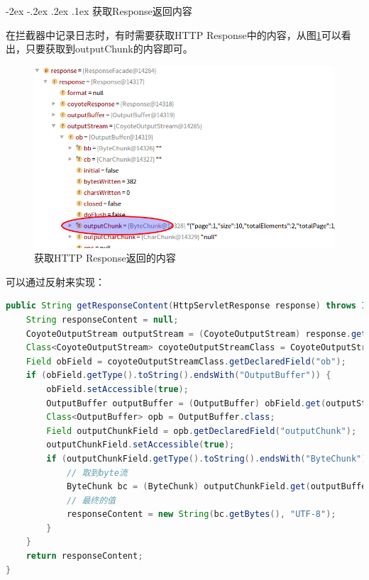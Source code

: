 \documentclass[12pt]{book}
\makeatletter
\numberwithin{dummy}{section}
\theoremstyle{ocrenumbox}
\theoremstyle{blacknumex}
\theoremstyle{blacknumbox}
\theoremstyle{ocrenum}
\renewcommand\paragraph{\@startsection{paragraph}{4}{\z@}
	{-2ex \@plus-.2ex \@minus .2ex}
	{.1ex}
	{\normalfont\small\sffamily\bfseries}}
\newlength\esp
\makeatother
\begin{document}
\paragraph{获取Response返回内容}

在拦截器中记录日志时，有时需要获取HTTP Response中的内容，从图\ref{fig:outputchunkcontent}可以看出，只要获取到outputChunk的内容即可。

\begin{figure}[htbp]
	\centering
	\includegraphics[scale=0.5]{outputchunkcontent.png}
	\caption{获取HTTP Response返回的内容}
	\label{fig:outputchunkcontent}
\end{figure}


可以通过反射来实现：

\begin{lstlisting}[language=Java]
public String getResponseContent(HttpServletResponse response) throws IOException, NoSuchFieldException, IllegalAccessException {
	String responseContent = null;
	CoyoteOutputStream outputStream = (CoyoteOutputStream) response.getOutputStream();
	Class<CoyoteOutputStream> coyoteOutputStreamClass = CoyoteOutputStream.class;
	Field obField = coyoteOutputStreamClass.getDeclaredField("ob");
	if (obField.getType().toString().endsWith("OutputBuffer")) {
		obField.setAccessible(true);
		OutputBuffer outputBuffer = (OutputBuffer) obField.get(outputStream);
		Class<OutputBuffer> opb = OutputBuffer.class;
		Field outputChunkField = opb.getDeclaredField("outputChunk");
		outputChunkField.setAccessible(true);
		if (outputChunkField.getType().toString().endsWith("ByteChunk")) {
			// 取到byte流
			ByteChunk bc = (ByteChunk) outputChunkField.get(outputBuffer);
			// 最终的值
			responseContent = new String(bc.getBytes(), "UTF-8");
		}
	}
	return responseContent;
}
\end{lstlisting}
\end{document}
